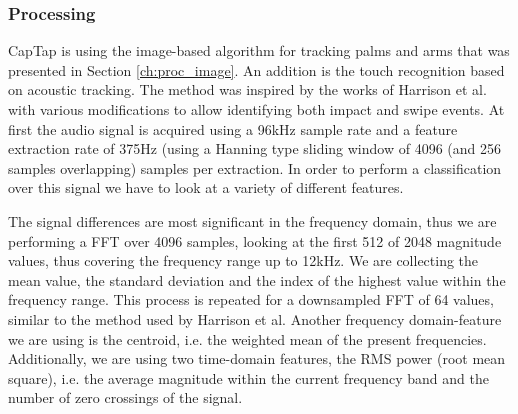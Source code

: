 \subsubsection{Processing}
CapTap is using the image-based algorithm for tracking palms and arms that was presented in Section \ref{ch:proc_image}. An addition is the touch recognition based on acoustic tracking. The method was inspired by the works of Harrison et al. \cite{harrison2011tapsense} with various modifications to allow identifying both impact and swipe events. At first the audio signal is acquired using a 96kHz sample rate and a feature extraction rate of 375Hz (using a  Hanning type sliding window of 4096 (and 256 samples overlapping) samples per extraction. In order to perform a classification over this signal we have to look at a variety of different features.

The signal differences are most significant in the frequency domain, thus we are performing a FFT over 4096 samples, looking at the first 512 of 2048 magnitude values, thus covering the frequency range up to 12kHz. We are collecting the mean value, the standard deviation and the index of the highest value within the frequency range. This process is repeated for a downsampled FFT of 64 values, similar to the method used by Harrison et al. Another frequency domain-feature we are using is the centroid, i.e. the weighted mean of the present frequencies. Additionally, we are using two time-domain features, the RMS power (root mean square), i.e. the average magnitude within the current frequency band and the number of zero crossings of the signal. 

